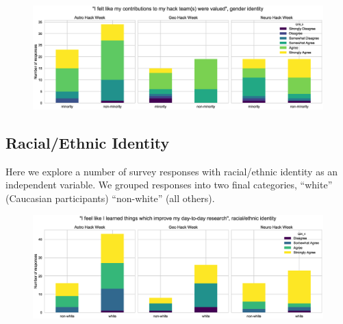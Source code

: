 \documentclass{aastex62}
\begin{document}
\begin{figure}[h!]
\centering
\includegraphics[width=\textwidth]{Q19_5_Q27_stackedbars.eps}
\caption{}
\label{fig:survey}
\end{figure}

\clearpage

\subsection{Racial/Ethnic Identity}

Here we explore a number of survey responses with racial/ethnic identity as an independent variable. We grouped responses into two final categories, ``white'' (Caucasian participants) ``non-white'' (all others).

\begin{figure}[h!]
\centering
\includegraphics[width=\textwidth]{Q24_4_Q30_stackedbars.eps}
\caption{}
\label{fig:survey}
\end{figure}
\end{document}

